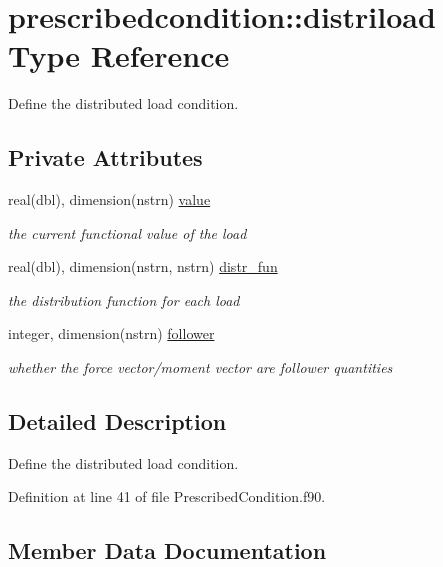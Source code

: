 \hypertarget{structprescribedcondition_1_1distriload}{}\section{prescribedcondition\+:\+:distriload Type Reference}
\label{structprescribedcondition_1_1distriload}


Define the distributed load condition.  


\subsection*{Private Attributes}
\begin{DoxyCompactItemize}
\item 
real(dbl), dimension(nstrn) \hyperlink{structprescribedcondition_1_1distriload_a32fb9fe519f0164a70313c8e7627976b}{value}
\begin{DoxyCompactList}\small\item\em the current functional value of the load \end{DoxyCompactList}\item 
real(dbl), dimension(nstrn, nstrn) \hyperlink{structprescribedcondition_1_1distriload_ac5734eaac28c08f44fd4f41857df75b2}{distr\+\_\+fun}
\begin{DoxyCompactList}\small\item\em the distribution function for each load \end{DoxyCompactList}\item 
integer, dimension(nstrn) \hyperlink{structprescribedcondition_1_1distriload_a476acfacfaac7a9d8ebaf6ce371279ff}{follower}
\begin{DoxyCompactList}\small\item\em whether the force vector/moment vector are follower quantities \end{DoxyCompactList}\end{DoxyCompactItemize}


\subsection{Detailed Description}
Define the distributed load condition. 

Definition at line 41 of file Prescribed\+Condition.\+f90.



\subsection{Member Data Documentation}
\mbox{\label{structprescribedcondition_1_1distriload_ac5734eaac28c08f44fd4f41857df75b2}} 
